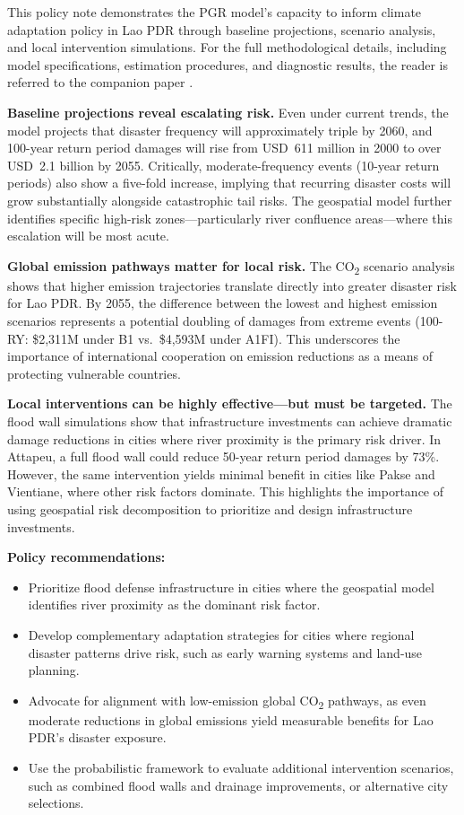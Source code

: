 \documentclass[11pt,a4paper]{article}
\begin{document}
This policy note demonstrates the PGR model's capacity to inform climate adaptation policy in Lao PDR through baseline projections, scenario analysis, and local intervention simulations. For the full methodological details, including model specifications, estimation procedures, and diagnostic results, the reader is referred to the companion paper \cite{saldarriaga2026}.

\textbf{Baseline projections reveal escalating risk.} Even under current trends, the model projects that disaster frequency will approximately triple by 2060, and 100-year return period damages will rise from USD~611 million in 2000 to over USD~2.1 billion by 2055. Critically, moderate-frequency events (10-year return periods) also show a five-fold increase, implying that recurring disaster costs will grow substantially alongside catastrophic tail risks. The geospatial model further identifies specific high-risk zones---particularly river confluence areas---where this escalation will be most acute.

\textbf{Global emission pathways matter for local risk.} The CO\textsubscript{2} scenario analysis shows that higher emission trajectories translate directly into greater disaster risk for Lao PDR. By 2055, the difference between the lowest and highest emission scenarios represents a potential doubling of damages from extreme events (100-RY: \$2,311M under B1 vs.\ \$4,593M under A1FI). This underscores the importance of international cooperation on emission reductions as a means of protecting vulnerable countries.

\textbf{Local interventions can be highly effective---but must be targeted.} The flood wall simulations show that infrastructure investments can achieve dramatic damage reductions in cities where river proximity is the primary risk driver. In Attapeu, a full flood wall could reduce 50-year return period damages by 73\%. However, the same intervention yields minimal benefit in cities like Pakse and Vientiane, where other risk factors dominate. This highlights the importance of using geospatial risk decomposition to prioritize and design infrastructure investments.

\textbf{Policy recommendations:}
\begin{itemize}[leftmargin=2em]
  \item Prioritize flood defense infrastructure in cities where the geospatial model identifies river proximity as the dominant risk factor.
  \item Develop complementary adaptation strategies for cities where regional disaster patterns drive risk, such as early warning systems and land-use planning.
  \item Advocate for alignment with low-emission global CO\textsubscript{2} pathways, as even moderate reductions in global emissions yield measurable benefits for Lao PDR's disaster exposure.
  \item Use the probabilistic framework to evaluate additional intervention scenarios, such as combined flood walls and drainage improvements, or alternative city selections.
\end{itemize}
\end{document}
